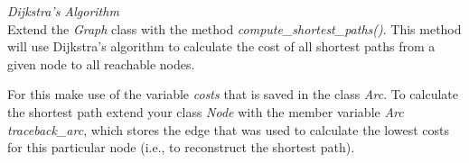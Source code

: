   \textit{Dijkstra's Algorithm}\\
Extend the \emph{Graph} class with the method \emph{compute\_shortest\_paths()}. 
This method will use Dijkstra's algorithm to calculate the 
cost of all shortest paths from a given node to all reachable nodes. 

For this make use of the variable \emph{costs} that is saved in the class 
\emph{Arc}. To calculate the shortest path extend your class \emph{Node} with the 
member variable \emph{Arc traceback\_arc}, which stores the edge that was used to 
calculate the lowest costs for this particular node (i.e., to reconstruct the shortest path).

